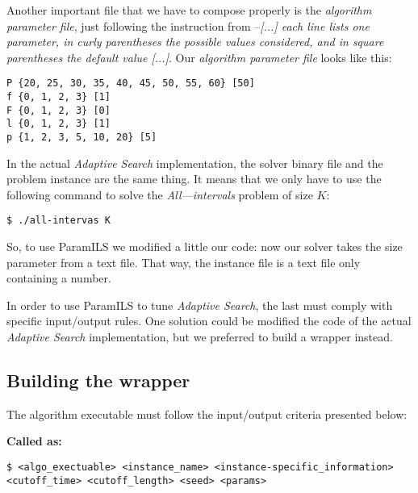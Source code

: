 Another important file that we have to compose properly is the {\it algorithm parameter file}, just following the instruction from \cite{Hutter2008} --\textit{[...] each line lists one parameter, in curly parentheses the possible values considered, and in square parentheses the default value [...]}. Our {\it algorithm parameter file} looks like this:\\

\begin{shadedbox}
	\texttt{P \{20, 25, 30, 35, 40, 45, 50, 55, 60\} [50]\\
		f \{0, 1, 2, 3\} [1]\\
		F \{0, 1, 2, 3\} [0]\\
		l \{0, 1, 2, 3\} [1]\\
		p \{1, 2, 3, 5, 10, 20\} [5]
	}
\end{shadedbox}

In the actual {\it Adaptive Search} implementation, the solver binary file and the problem instance are the same thing. It means that we only have to use the following command to solve the {\it All---intervals} problem of size $K$: 

\begin{center}
	\texttt{\$ ./all-intervas K}
\end{center}

So, to use {\sc ParamILS} we modified a little our code: now our solver takes the size parameter from a text file. That way, the instance file is a text file only containing a number.

In order to use {\sc ParamILS} to tune {\it Adaptive Search}, the last must comply with specific input/output rules. One solution could be modified the code of the actual {\it Adaptive Search} implementation, but we preferred to build a wrapper instead.

\subsection{Building the wrapper}

The algorithm executable must follow the input/output criteria presented below: 

\textbf{\large Called as:} 

\begin{verbatim}
$ <algo_exectuable> <instance_name> <instance-specific_information> 
<cutoff_time> <cutoff_length> <seed> <params>
\end{verbatim}

